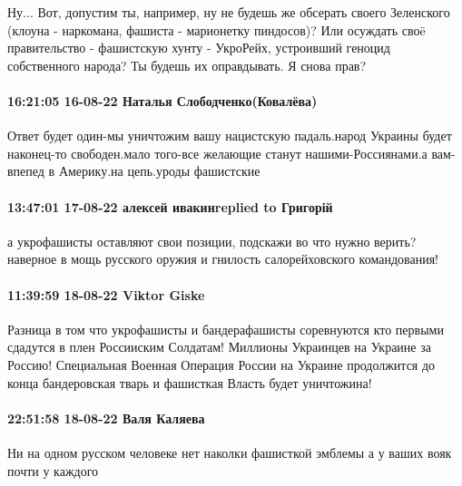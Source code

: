 Ну... Вот, допустим ты, например, ну не будешь же обсерать своего Зеленского (клоуна - наркомана, фашиста - марионетку пиндосов)?
Или осуждать своë правительство - фашистскую хунту - УкроРейх, устроивший геноцид собственного народа?
Ты будешь их оправдывать.
Я снова прав?

\paragraph{16:21:05 16-08-22 Наталья Слободченко(Ковалёва)}

Ответ будет один-мы уничтожим вашу нацистскую падаль.народ Украины будет
наконец-то свободен.мало того-все желающие станут нашими-Россиянами.а
вам-впепед в Америку.на цепь.уроды фашистские

\paragraph{13:47:01 17-08-22 алексей ивакинreplied to Григорій}

а укрофашисты оставляют свои позиции, подскажи во что нужно верить? наверное в
мощь русского оружия и гнилость салорейховского командования!

\paragraph{11:39:59 18-08-22 Viktor Giske}

Разница в том что укрофашисты и бандерафашисты соревнуются кто первыми сдадутся
в плен Россииским Солдатам! Миллионы Украинцев на Украине за Россию!
Специальная Военная Операция России на Украине продолжится до конца
бандеровская тварь и фашисткая Власть будет уничтожина!

\paragraph{22:51:58 18-08-22 Валя Каляева}

Ни на одном русском человеке нет наколки фашисткой эмблемы а у ваших вояк почти
у каждого
